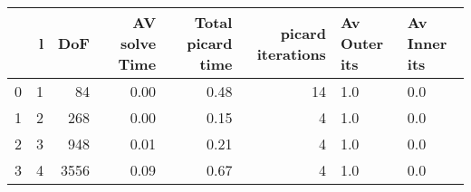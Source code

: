 \begin{tabular}{lrrrrrll}
\toprule
{} &  l &   DoF &  AV solve Time &  Total picard time &  picard iterations & Av Outer its & Av Inner its \\
\midrule
0 &  1 &    84 &           0.00 &               0.48 &                 14 &          1.0 &          0.0 \\
1 &  2 &   268 &           0.00 &               0.15 &                  4 &          1.0 &          0.0 \\
2 &  3 &   948 &           0.01 &               0.21 &                  4 &          1.0 &          0.0 \\
3 &  4 &  3556 &           0.09 &               0.67 &                  4 &          1.0 &          0.0 \\
\bottomrule
\end{tabular}
